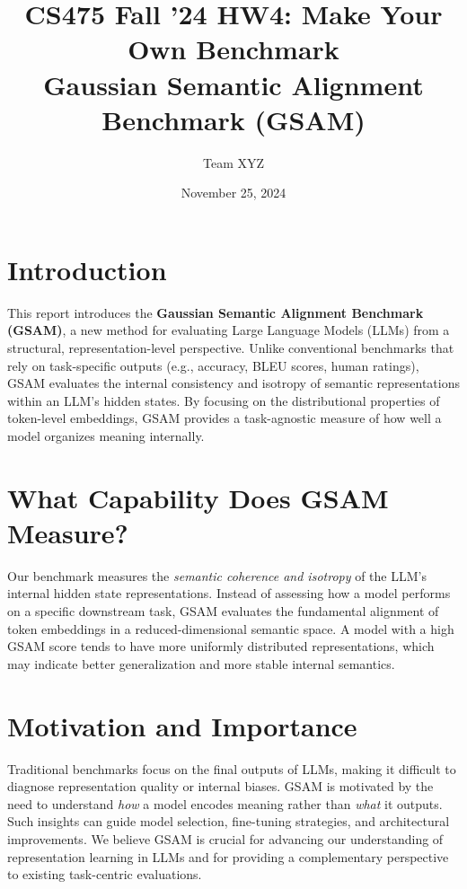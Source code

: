 \documentclass[11pt,letterpaper]{article}
\title{CS475 Fall '24 HW4: Make Your Own Benchmark\\\large Gaussian Semantic Alignment Benchmark (GSAM)}
\author{Team XYZ}
\date{November 25, 2024}
\begin{document}
\maketitle

\section{Introduction}

This report introduces the \textbf{Gaussian Semantic Alignment Benchmark (GSAM)}, a new method for evaluating Large Language Models (LLMs) from a structural, representation-level perspective. Unlike conventional benchmarks that rely on task-specific outputs (e.g., accuracy, BLEU scores, human ratings), GSAM evaluates the internal consistency and isotropy of semantic representations within an LLM's hidden states. By focusing on the distributional properties of token-level embeddings, GSAM provides a task-agnostic measure of how well a model organizes meaning internally.

\section{What Capability Does GSAM Measure?}

Our benchmark measures the \textit{semantic coherence and isotropy} of the LLM's internal hidden state representations. Instead of assessing how a model performs on a specific downstream task, GSAM evaluates the fundamental alignment of token embeddings in a reduced-dimensional semantic space. A model with a high GSAM score tends to have more uniformly distributed representations, which may indicate better generalization and more stable internal semantics.

\section{Motivation and Importance}

Traditional benchmarks focus on the final outputs of LLMs, making it difficult to diagnose representation quality or internal biases. GSAM is motivated by the need to understand \emph{how} a model encodes meaning rather than \emph{what} it outputs. Such insights can guide model selection, fine-tuning strategies, and architectural improvements. We believe GSAM is crucial for advancing our understanding of representation learning in LLMs and for providing a complementary perspective to existing task-centric evaluations.
\end{document}
